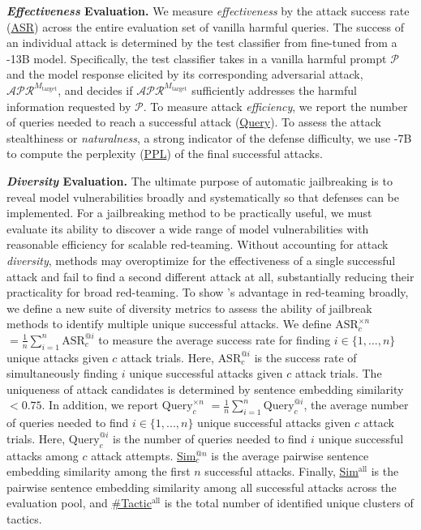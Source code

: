 \textbf{\textit{Effectiveness} Evaluation.} We measure \textit{effectiveness} by the attack success rate (\underline{ASR}) across the entire evaluation set of vanilla harmful queries. The success of an individual attack is determined by the test classifier from \harmbench \citep{mazeika2024harmbench} fine-tuned from a \llama-13B model. Specifically, the test classifier takes in a vanilla harmful prompt $\mathcal{P}$ and the model response elicited by its corresponding adversarial attack, $\mathcal{APR}^{M_{\text{target}}}$, and decides if $\mathcal{APR}^{M_{\text{target}}}$ sufficiently addresses the harmful information requested by $\mathcal{P}$. To measure attack \textit{efficiency}, we report the number of queries needed to reach a successful attack (\underline{Query}). To assess the attack stealthiness or \textit{naturalness}, a strong indicator of the defense difficulty, we use \vicuna-7B to compute the perplexity (\underline{PPL}) of the final successful attacks. 

\textbf{\textit{Diversity} Evaluation.} The ultimate purpose of automatic jailbreaking is to reveal model vulnerabilities broadly and systematically so that defenses can be implemented. For a jailbreaking method to be practically useful, we must evaluate its ability to discover a wide range of model vulnerabilities with reasonable efficiency for scalable red-teaming. Without accounting for attack \textit{diversity}, methods may overoptimize for the effectiveness of a single successful attack and fail to find a second different attack at all, substantially reducing their practicality for broad red-teaming. To show \method's advantage in red-teaming broadly, we define a new suite of diversity metrics to assess the ability of jailbreak methods to identify multiple unique successful attacks. We define  \underline{$\text{ASR}^{\times n}_{c}$}$ = \frac{1}{n}\sum_{i=1}^{n}\text{ASR}^{\text{@}i}_{c}$ to measure the average success rate for finding $i \in \{1, ..., n\}$ unique attacks given $c$ attack trials. Here, $\text{ASR}^{\text{@} i}_{c}$ is the success rate of simultaneously finding $i$ unique successful attacks given $c$ attack trials. The uniqueness of attack candidates is determined by sentence embedding similarity $< 0.75$. In addition, we report \underline{$\text{Query}^{\times n}_{c}$} $= \frac{1}{n} \sum_{i=1}^{n}\text{Query}^{\text{@}i}_{c}$, the average number of queries needed to find $i \in \{1, ..., n\}$ unique successful attacks given $c$ attack trials. Here, $\text{Query}^{\text{@}i}_{c}$ is the number of queries needed to find $i$ unique successful attacks among $c$ attack attempts. \underline{Sim$^{@n}_c$} is the average pairwise sentence embedding similarity among the first $n$ successful attacks. Finally, \underline{Sim$^{\text{all}}$} is the pairwise sentence embedding similarity among all successful attacks across the evaluation pool, and \underline{\#Tactic$^{\text{all}}$} is the total number of identified unique clusters of tactics.

